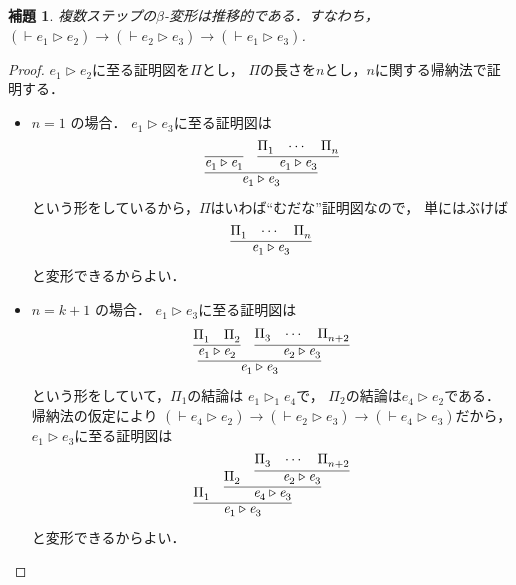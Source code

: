 \documentclass{ltjsbook}%
\newtheorem{lemma}{補題}[section]%
\begin{document}
\begin{lemma}%
  \label{lemma:beta_reduct_trans}%
  複数ステップの$\beta$-変形は推移的である．すなわち，%
  $(\vdash\mathit{e}_1^{}\triangleright\mathit{e}_2^{})\rightarrow%
  (\vdash\mathit{e}_2^{}\triangleright\mathit{e}_3^{})\rightarrow%
  (\vdash\mathit{e}_1^{}\triangleright\mathit{e}_3^{})$.%
\end{lemma}%
\begin{proof}%
  $\mathit{e}_1^{}\triangleright\mathit{e}_2^{}$に至る証明図を$\Pi$とし，%
  $\Pi$の長さを$n$とし，$n$に関する帰納法で証明する．%
  \begin{itemize}%
  \item $n=1$ の場合．%
    $\mathit{e}_1^{}\triangleright\mathit{e}_3^{}$に至る証明図は%
    \begin{equation}%
      \infer{%
        \mathit{e}_1^{}\triangleright\mathit{e}_3^{}%
      }{%
        \infer{\mathit{e}_1^{}\triangleright\mathit{e}_1^{}}{}%
      &%
        \infer{\mathit{e}_1^{}\triangleright\mathit{e}_3^{}}{\Pi_1^{}&\cdots&\Pi_n^{}}%
      }%
    \end{equation}%
    という形をしているから，$\Pi$はいわば``むだな''証明図なので，%
    単にはぶけば%
    \begin{equation}%
      \infer{\mathit{e}_1^{}\triangleright\mathit{e}_3^{}}{\Pi_1^{}&\cdots&\Pi_n^{}}%
    \end{equation}%
    と変形できるからよい．%
  \item $n=k + 1$ の場合．%
    $\mathit{e}_1^{}\triangleright\mathit{e}_3^{}$に至る証明図は%
    \begin{equation}%
      \infer{%
        \mathit{e}_1^{}\triangleright\mathit{e}_3^{}%
      }{%
        \infer{%
          \mathit{e}_1^{}\triangleright\mathit{e}_2^{}%
        }{%
          \Pi_1^{}%
        &%
          \Pi_2^{}%
        }%
      &%
        \infer{%
          \mathit{e}_2^{}\triangleright\mathit{e}_3^{}%
        }{%
          \Pi_3^{}&\cdots&\Pi_{n+2}^{}%
        }%
      }%
    \end{equation}%
    という形をしていて，$\Pi_1^{}$の結論は%
    $\mathit{e}_1^{}\triangleright_1^{}\mathit{e}_4^{}$で，%
    $\Pi_2^{}$の結論は$\mathit{e}_4^{}\triangleright\mathit{e}_2^{}$である．%
    帰納法の仮定により%
    $(\vdash\mathit{e}_4^{}\triangleright\mathit{e}_2^{})\rightarrow%
    (\vdash\mathit{e}_2^{}\triangleright\mathit{e}_3^{})\rightarrow%
    (\vdash\mathit{e}_4^{}\triangleright\mathit{e}_3^{})$だから，%
    $\mathit{e}_1^{}\triangleright\mathit{e}_3^{}$に至る証明図は%
    \begin{equation}%
      \infer{%
        \mathit{e}_1^{}\triangleright\mathit{e}_3^{}%
      }{%
        \Pi_1^{}%
      &%
        \infer{%
          \mathit{e}_4^{}\triangleright\mathit{e}_3^{}%
        }{%
          \Pi_2^{}%
        &%
          \infer{%
            \mathit{e}_2^{}\triangleright\mathit{e}_3^{}%
          }{%
            \Pi_3^{}&\cdots&\Pi_{n+2}^{}%
          }%
        }%
      }%
    \end{equation}%
    と変形できるからよい．%
  \end{itemize}%
\end{proof}%
\end{document}
